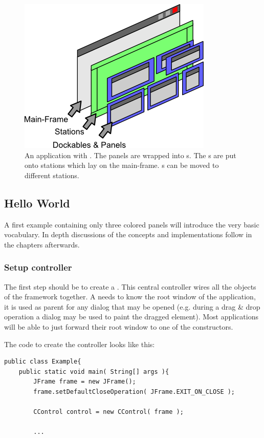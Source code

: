 \begin{figure}[ht]
\centering
\includegraphics[scale=1]{basics/app_with}
\caption{An application with . The panels are wrapped into s. The s are put onto stations which lay on the main-frame. s can be moved to different stations.}
\label{fig:app_with}
\end{figure}

\subsection{Hello World}
A first example containing only three colored panels will introduce the very basic vocabulary. In depth discussions of the concepts and implementations follow in the chapters afterwards.

\subsubsection{Setup controller}
The first step should be to create a . This central controller wires all the objects of the framework together. A  needs to know the root window of the application, it is used as parent for any dialog that may be opened (e.g. during a drag \& drop operation a dialog may be used to paint the dragged element). Most applications will be able to just forward their root window to one of the constructors.

The code to create the controller looks like this:
\begin{lstlisting}
public class Example{
	public static void main( String[] args ){
		JFrame frame = new JFrame();
		frame.setDefaultCloseOperation( JFrame.EXIT_ON_CLOSE );
		
		CControl control = new CControl( frame );
		
		...
\end{lstlisting}

